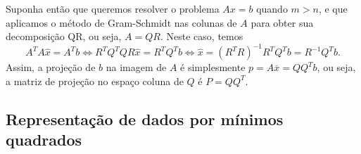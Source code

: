 Suponha então que queremos resolver o problema $Ax=b$ quando $m>n$, e que aplicamos o método de Gram-Schmidt nas colunas de $A$ para obter sua decomposição QR, ou seja, $A=QR$. Neste caso, temos
\begin{equation*}
   A^TA\hat{x} = A^Tb \Leftrightarrow R^TQ^TQR\hat{x}=R^TQ^Tb \Leftrightarrow \hat{x} = (R^TR)^{-1}R^TQ^Tb = R^{-1}Q^Tb.
\end{equation*}
Assim, a projeção de $b$ na imagem de $A$ é simplesmente $p = A\overline{x} = QQ^Tb$, ou seja, a matriz de projeção no espaço coluna de $Q$ é $P=QQ^T$.

\subsection{Representação de dados por mínimos quadrados}

